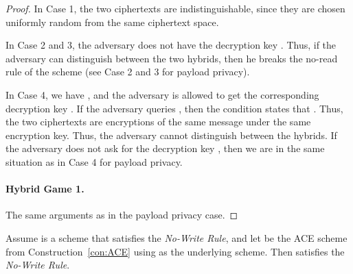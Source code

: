\documentclass{llncs}
\begin{document}
\begin{proof}
In Case 1, the two ciphertexts are indistinguishable, since they are chosen uniformly random from the same ciphertext space. 

In Case 2 and 3, the adversary does not have the decryption key . Thus, if the adversary can distinguish between the two hybrids, then he breaks the no-read rule of the \oACE scheme (see Case 2 and 3 for payload privacy). 

In Case 4, we have , and the adversary is allowed to get the corresponding decryption key . If the adversary queries , then the condition states that . Thus, the two \oACE ciphertexts are encryptions of the same message under the same \oACE encryption key. Thus, the adversary cannot distinguish between the hybrids.
If the adversary does not ask for the decryption key , then we are in the same situation as in Case 4 for payload privacy.

\paragraph{Hybrid   Game 1.} The same arguments as in the payload privacy case.


\end{proof}



\begin{thm} \label{thm:no-write}
Assume  is a \oACE scheme that satisfies the \emph{No-Write Rule}, and let  be the ACE scheme from Construction~\ref{con:ACE} using  as the underlying \oACE scheme. Then  satisfies the \emph{No-Write Rule}. 
\end{thm}
\end{document}
